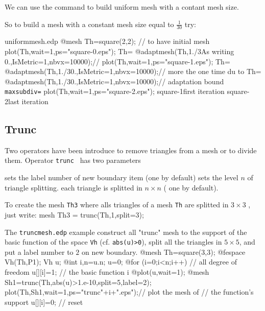 \documentclass[a4paper,twoside,12pt]{book}
\begin{document}


 We can use the command  to build uniform mesh with a
 contant mesh size. 

 So to build a mesh with a constant mesh size equal to $\frac{1}{30}$ try:

\begin{example}{uniformmesh.edp} 
\bFF
@mesh Th=square(2,2); // to have initial mesh
plot(Th,wait=1,ps="square-0.eps");
Th= @adaptmesh(Th,1./3As writing
0.,IsMetric=1,nbvx=10000);// 
plot(Th,wait=1,ps="square-1.eps");
Th= @adaptmesh(Th,1./30.,IsMetric=1,nbvx=10000);//  more the one time du to
Th= @adaptmesh(Th,1./30.,IsMetric=1,nbvx=10000);//  adaptation  bound \texttt{maxsubdiv=}
plot(Th,wait=1,ps="square-2.eps");
\eFF
{}%
{square-1}{first iteration}%
{square-2}{last iteration}%
\end{example}

\subsection{Trunc}

Two operators have been introduce to remove triangles from a mesh or to divide them.
Operator {\tt trunc } has two parameters
  
\begin{description}
  \itemtt[label=] sets the label number of new boundary item (one by default)
  \itemtt[split=] sets the level $n$ of triangle splitting. each triangle is splitted in  $n\times n$ ( one by default).
\end{description}

To create the mesh \texttt{Th3}
where alls  triangles of a mesh \texttt{Th}  are splitted in $3{\times}3$ , just write:
\bFF
  mesh Th3 = trunc(Th,1,split=3);
\eFF

The  \texttt{truncmesh.edp} example construct
all "trunc" mesh  to the support of the basic function  of the space \texttt{Vh} (cf. \texttt{abs(u)>0}),
split all the  triangles in $5{\times} 5$, and put a label number to $2$ on new boundary.
\bFF
@mesh Th=square(3,3);
@fespace Vh(Th,P1);
Vh u;
@int i,n=u.n;
u=0;
@for (i=0;i<n;i++)  // all degree of freedom
 {
  u[][i]=1;        //  the basic function i
  @plot(u,wait=1);
  @mesh Sh1=trunc(Th,abs(u)>1.e-10,split=5,label=2);
  plot(Th,Sh1,wait=1,ps="trunc"+i+".eps");// plot the mesh of
  // the function's support
  u[][i]=0;      // reset
 }
\eFF
{}
\end{document}

